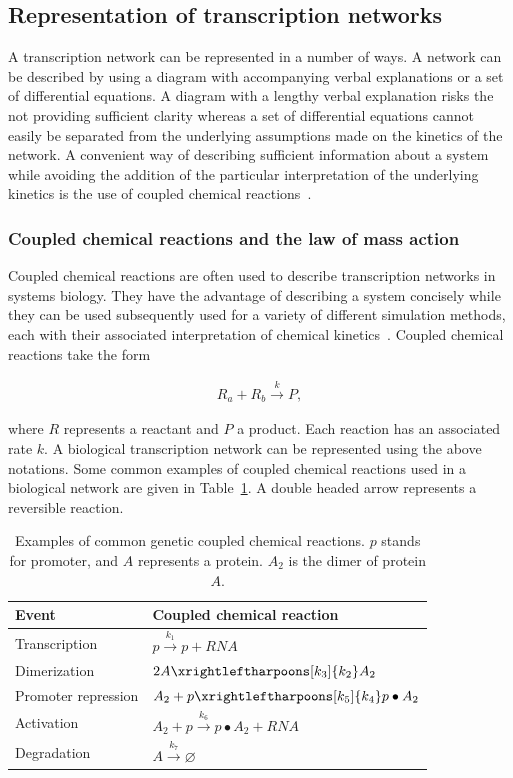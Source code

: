 \subsection{Representation of transcription networks}
A transcription network can be represented in a number of ways. A network can be described by using a diagram with accompanying verbal explanations or a set of differential equations. A diagram with a lengthy verbal explanation risks the not providing sufficient clarity whereas a set of differential equations cannot easily be separated from the underlying assumptions made on the kinetics of the network. A convenient way of describing sufficient information about a system while avoiding the addition of the particular interpretation of the underlying kinetics is the use of coupled chemical reactions~\autocite{Wilkinson:2006td}. 

\subsubsection{Coupled chemical reactions and the law of mass action}

Coupled chemical reactions are often used to describe transcription networks in systems biology. They have the advantage of describing a system concisely while they can be used subsequently used for a variety of different simulation methods, each with their associated interpretation of chemical kinetics~\autocite{Wilkinson:2006td}. Coupled chemical reactions take the form


\begin{align}
	R_a + R_b \xrightarrow{k} P, \label{eq:example_eq}
\end{align}

\noindent where $R$ represents a reactant and $P$ a product. Each reaction has an associated rate $k$. A biological transcription network can be represented using the above notations. Some common examples of coupled chemical reactions used in a biological network are given in Table~\ref{tab:chem_reac_ex}. A double headed arrow represents a reversible reaction. 


\begin{table}[tb]
\centering
\caption{Examples of common genetic coupled chemical reactions. $p$ stands for promoter, and $A$ represents a protein. $A_2$ is the dimer of protein $A$.  }
\label{tab:chem_reac_ex}
\begin{tabular}{@{}ll@{}}
\toprule
Event & Coupled chemical reaction \\ \midrule
Transcription & $p  \xrightarrow{k_1} p + RNA$ \\
Dimerization & $2A \xrightleftharpoons[k_3]{k_2} A_2$ \\
Promoter repression & $A_2 + p \xrightleftharpoons[k_5]{k_4} p\bullet A_2$ \\
Activation & $A_2 + p \xrightarrow{k_6} p\bullet A_2 + RNA$ \\
Degradation & $A \xrightarrow{k_7}\varnothing $ \\ \bottomrule
\end{tabular}
\end{table}

